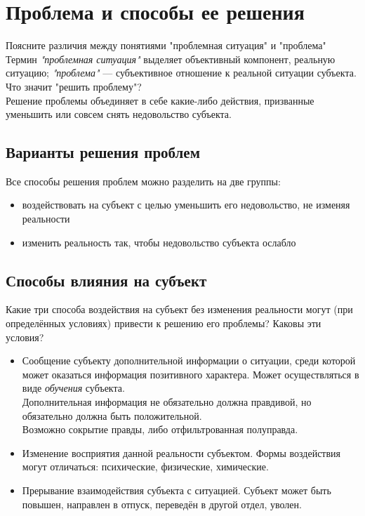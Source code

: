 \documentclass{article}
\newcommand{\note}[1]{\textit{#1}}
\begin{document}
\section{Проблема и способы ее решения}
Поясните различия между понятиями "проблемная ситуация" и "проблема"
\\
Термин \note{"проблемная ситуация"} выделяет объективный компонент, реальную ситуацию; \note{"проблема"} --- субъективное отношение к реальной ситуации субъекта.
\\
Что значит "решить проблему"?
\\
Решение проблемы объединяет в себе какие-либо действия, призванные уменьшить или совсем снять недовольство субъекта.
\subsection*{Варианты решения проблем}
Все способы решения проблем можно разделить на две группы:
\begin{itemize}
	\item воздействовать на субъект с целью уменьшить его недовольство, не изменяя реальности
	\item изменить реальность так, чтобы недовольство субъекта ослабло
\end{itemize}
\subsection*{Способы влияния на субъект}
Какие три способа воздействия на субъект без изменения реальности могут (при определённых условиях) привести к решению его проблемы? Каковы эти условия?
\begin{itemize}
	\item Сообщение субъекту дополнительной информации о ситуации, среди которой может оказаться информация позитивного характера. Может осуществляться в виде \note{обучения} субъекта.\\Дополнительная информация не обязательно должна правдивой, но обязательно должна быть положительной.\\Возможно сокрытие правды, либо отфильтрованная полуправда.
	\item Изменение восприятия данной реальности субъектом. Формы воздействия могут отличаться: психические, физические, химические.
	\item Прерывание взаимодействия субъекта с ситуацией. Субъект может быть повышен, направлен в отпуск, переведён в другой отдел, уволен.
\end{itemize}
\end{document}
